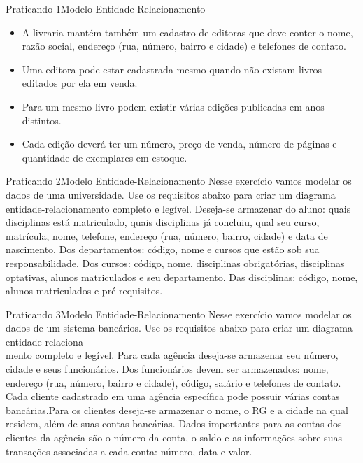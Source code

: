 \documentclass[t]{beamer}
\begin{document}

\begin{ftst}{Praticando 1}{Modelo Entidade-Relacionamento}


\begin{itemize}
    \item A livraria mantém também um cadastro de editoras que deve conter o nome, razão social, endereço (rua, número, bairro e cidade) e telefones de contato.
    \item Uma editora pode estar cadastrada mesmo quando não existam livros editados por ela em venda.
    \item Para um mesmo livro podem existir várias edições publicadas em anos distintos.
    \item Cada edição deverá ter um número, preço de venda, número de páginas e quantidade de exemplares em estoque.
\end{itemize}

\end{ftst}


\begin{ftst}{Praticando 2}{Modelo Entidade-Relacionamento}
Nesse exercício vamos modelar os dados de uma universidade. Use os requisitos abaixo para criar um diagrama entidade-relacionamento completo e legível.
\vone
Deseja-se armazenar do aluno: quais disciplinas está matriculado, quais disciplinas já concluiu, qual seu curso, matrícula, nome, telefone, endereço (rua, número, bairro, cidade) e data de nascimento. Dos departamentos: código, nome e cursos que estão sob sua responsabilidade. Dos cursos: código, nome, disciplinas obrigatórias, disciplinas optativas, alunos matriculados e seu departamento. Das disciplinas: código, nome, alunos matriculados e pré-requisitos.

\end{ftst}


\begin{ftst}{Praticando 3}{Modelo Entidade-Relacionamento}
Nesse exercício vamos modelar os dados de um sistema bancários. Use os requisitos abaixo para criar um diagrama entidade-relaciona- \\ mento completo e legível.
\vone
Para cada agência deseja-se armazenar seu número, cidade e seus funcionários. Dos funcionários devem ser armazenados: nome, endereço (rua, número, bairro e cidade), código, salário e telefones de contato. Cada cliente cadastrado em uma agência específica pode possuir várias contas bancárias.Para os clientes deseja-se armazenar o nome, o RG e a cidade na qual residem, além de suas contas bancárias. Dados importantes para as contas dos clientes da agência são o número da conta, o saldo e as informações sobre suas transações associadas a cada conta: número, data e valor.
\end{ftst}
\end{document}
